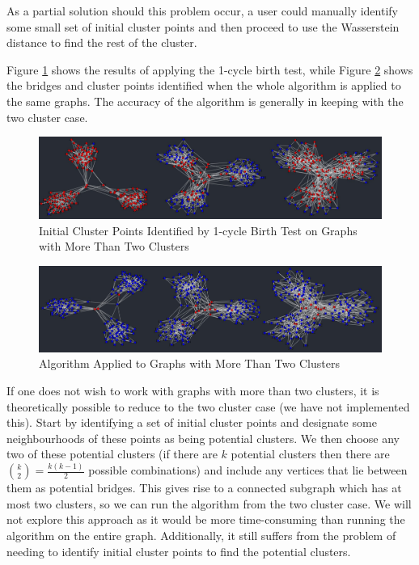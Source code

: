 \documentclass[12pt,a4paper]{amsart}
\numberwithin{equation}{section}
\theoremstyle{plain}
\theoremstyle{definition}
\begin{document}
As a partial solution should this problem occur, a user could manually identify some small set of initial cluster points and then proceed to use the Wasserstein distance to find the rest of the cluster.

Figure \ref{multiclusters} shows the results of applying the 1-cycle birth test, while Figure \ref{multiclustersfinal} shows the bridges and cluster points identified when the whole algorithm is applied to the same graphs. The accuracy of the algorithm is generally in keeping with the two cluster case.

\begin{figure}[h]
	\centering	
	\includegraphics[scale=0.45]{Multiclusters.jpg}
	\caption{Initial Cluster Points Identified by 1-cycle Birth Test on Graphs with More Than Two Clusters}
	\label{multiclusters}
\end{figure}

\begin{figure}[h]
	\centering
	\includegraphics[scale=0.45]{MulticlustersFinal.jpg}
	\caption{Algorithm Applied to Graphs with More Than Two Clusters}
	\label{multiclustersfinal}
\end{figure}

If one does not wish to work with graphs with more than two clusters, it is theoretically possible to reduce to the two cluster case (we have not implemented this). Start by identifying a set of initial cluster points and designate some neighbourhoods of these points as being potential clusters. We then choose any two of these potential clusters (if there are $k$ potential clusters then there are $\binom{k}{2} = \frac{k(k-1)}{2}$ possible combinations) and include any vertices that lie between them as potential bridges. This gives rise to a connected subgraph which has at most two clusters, so we can run the algorithm from the two cluster case. We will not explore this approach as it would be more time-consuming than running the algorithm on the entire graph. Additionally, it still suffers from the problem of needing to identify initial cluster points to find the potential clusters.
\end{document}
